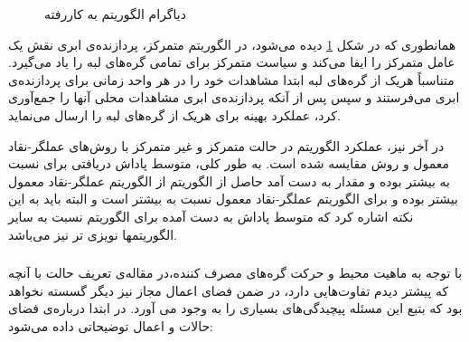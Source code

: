 \begin{figure}[ht]
	\centering 
	\hspace{2mm}
	\caption{دیاگرام الگوریتم  به کاررفته}
	\label{fig:centralizedvsdec} %
\end{figure}

همانطوری که در شکل \ref{fig:centralizedvsdec} دیده می‌شود، در الگوریتم متمرکز، پردازنده‌ی ابری نقش یک عامل متمرکز را ایفا می‌کند و سیاست متمرکز برای تمامی گره‌های لبه را یاد می‌گیرد. متناسباً هریک از گره‌های لبه ابتدا مشاهدات خود را در هر واحد زمانی برای پردازنده‌ی ابری می‌فرستند و سپس پس از آنکه پردازنده‌ی ابری مشاهدات محلی آنها را جمع‌آوری کرد، عملکرد بهینه برای هریک از گره‌های لبه را ارسال می‌نماید. 

در آخر نیز، عملکرد الگوریتم  در حالت متمرکز و غیر متمرکز با روش‌های عملگر-نقاد معمول و روش  مقایسه شده است. به طور کلی، متوسط پاداش دریافتی برای  نسبت به  بیشتر بوده و مقدار به دست آمد حاصل از الگوریتم  از الگوریتم عملگر-نقاد معمول بیشتر بوده و برای الگوریتم عملگر-نقاد معمول نسبت به  بیشتر است و البته باید به این نکته اشاره کرد که متوسط پاداش به دست آمده برای الگوریتم  نسبت به سایر الگوریتمها نویزی تر نیز می‌باشد. 




\subsubsection{}
با توجه به ماهیت محیط و حرکت گره‌های مصرف کننده،‌در مقاله‌ی \cite{qiao2019deep} تعریف حالت با آنچه که پیشتر دیدم تفاوت‌هایی دارد، در ضمن فضای اعمال مجاز نیز دیگر گسسته نخواهد بود که بتبع این مسئله پیچیدگی‌های بسیاری را به وجود می آورد. در ابتدا درباره‌ی فضای حالات و اعمال توضیحاتی داده می‌شود:

